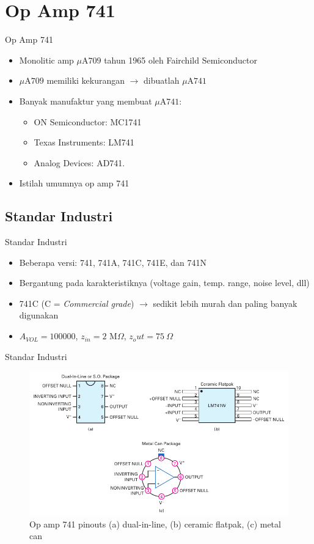 \section{Op Amp 741}
\begin{frame}{Op Amp 741}
	\begin{itemize}
		\item Monolitic amp $ \mu\text{A709} $ tahun 1965 oleh Fairchild Semiconductor
		\item $ \mu\text{A709} $ memiliki kekurangan $ \rightarrow $ dibuatlah $ \mu\text{A741} $
		\item Banyak manufaktur yang membuat $ \mu\text{A741} $:
		\begin{itemize}
			\item ON Semiconductor: MC1741
			\item Texas Instruments: LM741
			\item Analog Devices: AD741.
		\end{itemize}
		\item Istilah umumnya op amp 741
	\end{itemize}
\end{frame}

\subsection{Standar Industri}
\begin{frame}{Standar Industri}
	\begin{itemize}
		\item Beberapa versi: 741, 741A, 741C, 741E, dan 741N
		\item Bergantung pada karakteristiknya (voltage gain, temp. range, noise level, dll)
		\item 741C (C = \textit{Commercial grade}) $ \rightarrow $ sedikit lebih murah dan paling banyak digunakan
		\item $ A_{VOL} = 100000 $, $ z_{in} = 2 \text{ M}\Omega $, $ z_out = 75~\Omega $
	\end{itemize}
\end{frame}

\begin{frame}{Standar Industri}
	\begin{figure}
		\centering
		\includegraphics[width=0.7\linewidth]{gambar/fig-16.03}
		\caption{Op amp 741 pinouts (a) dual-in-line, (b) ceramic flatpak, (c) metal can}
		\label{fig-16.03}
	\end{figure}
\end{frame}


